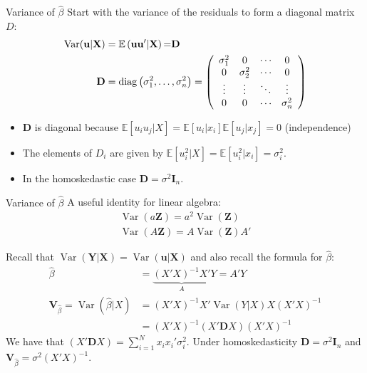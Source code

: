 \documentclass[aspectratio=169]{beamer}
\begin{document}
\begin{frame}{Variance of $\widehat{\beta}$}
Start with the variance of the residuals to form a \alert{diagonal} matrix $D$:
\begin{align*}
\operatorname { Var } ( \mathbf{u} | \mathbf { X } ) &= \mathbb { E } \left( \mathbf{u u} ^ { \prime } | \mathbf { X } \right){ = } \mathbf { D }\\
\mathbf { D } &= \operatorname { diag } \left( \sigma _ { 1 } ^ { 2 } , \ldots , \sigma _ { n } ^ { 2 } \right) = \left( \begin{array} { c c c c } { \sigma _ { 1 } ^ { 2 } } & { 0 } & { \cdots } & { 0 } \\ { 0 } & { \sigma _ { 2 } ^ { 2 } } & { \cdots } & { 0 } \\ { \vdots } & { \vdots } & { \ddots } & { \vdots } \\ { 0 } & { 0 } & { \cdots } & { \sigma _ { n } ^ { 2 } } \end{array} \right)
\end{align*}
\begin{itemize}
\item $\mathbf{D}$ is diagonal because $\mathbb { E }[u_i u_j | X] = \mathbb { E }[u_i  | x_i]  \mathbb { E }[u_j  | x_j]=0$ (independence)
\item The elements of $D_i$ are given by $\mathbb { E }[u_i^2 | X] = \mathbb { E }[u_i^2 | x_i] = \sigma_i^2$.
\item In the \alert{homoskedastic} case $\mathbf{D} = \sigma^2 \mathbf{I}_n$.
\end{itemize}
\end{frame}

\begin{frame}{Variance of $\widehat{\beta}$}
A useful identity for linear algebra:
\begin{align*}
\operatorname { Var } (a \mathbf{Z} ) = a^2 \operatorname { Var }(\mathbf{Z})\\
\operatorname { Var } (A \mathbf{Z} ) = A \operatorname { Var }(\mathbf{Z}) A'
\end{align*}

Recall that $\operatorname { Var } ( \mathbf{Y} |\mathbf{X} )  = \operatorname { Var } ( \mathbf{u} | \mathbf { X } ) $ and also
recall the formula for $\widehat{\beta}$:
\begin{align*}
\widehat{\beta} &= \underbrace{(X'X)^{-1} X' }_{A} Y= A' Y \\
\mathbf{V}_{\widehat{\beta}} = \operatorname { Var }(\widehat{\beta} | X)&= (X'X)^{-1} X'  \operatorname { Var }(Y| X) X (X'X)^{-1} \\
													     &= (X'X)^{-1} (X'  \mathbf{D} X) (X'X)^{-1} 
\end{align*}
We have that $ (X'  \mathbf{D} X)  = \sum_{i=1}^N x_i x_i'\sigma_i^2$. Under homoskedasticity $\mathbf{D} = \sigma^2 \mathbf{I}_n$ and $\mathbf{V}_{\widehat{\beta}} = \sigma^2 (X'X)^{-1}$.
\end{frame}
\end{document}
